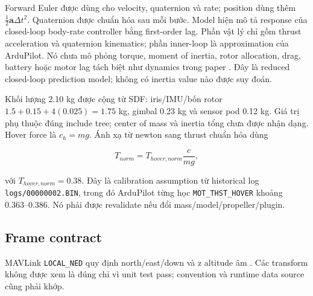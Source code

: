 \documentclass[11pt,a4paper]{article}
\newcommand{\code}[1]{\texttt{#1}}
\newcommand{\vect}[1]{\bm{#1}}
\begin{document}
Forward Euler được dùng cho velocity, quaternion và rate; position dùng thêm
$\tfrac12\vect a\Delta t^2$. Quaternion được chuẩn hóa sau mỗi bước. Model hiện
mô tả response của closed-loop body-rate controller bằng first-order lag. Phần
vật lý chỉ gồm thrust acceleration và quaternion kinematics; phần inner-loop là
approximation của ArduPilot. Nó chưa mô phỏng torque, moment of inertia, rotor
allocation, drag, battery hoặc motor lag tách biệt như dynamics trong paper
\cite{zhai2026pamppi}. Đây là reduced closed-loop prediction model; không có
inertia value nào được suy đoán.

Khối lượng 2.10 kg được cộng từ SDF: iris/IMU/bốn rotor
$1.5+0.15+4(0.025)=1.75$ kg, gimbal 0.23 kg và sensor pod 0.12 kg. Giá trị phụ
thuộc đúng include tree; center of mass và inertia tổng chưa được nhận dạng.
Hover force là $c_h=mg$. Ánh xạ từ newton sang thrust
chuẩn hóa dùng

\begin{equation}
T_{norm}=T_{hover,norm}\frac{c}{mg},
\end{equation}

với $T_{hover,norm}=0.38$. Đây là calibration assumption từ historical log
\code{logs/00000002.BIN}, trong đó ArduPilot từng học
\code{MOT\_THST\_HOVER} khoảng 0.363--0.386. Nó phải được revalidate nếu đổi
mass/model/propeller/plugin.

\subsection{Frame contract}

MAVLink \code{LOCAL\_NED} quy định north/east/down và z altitude âm
\cite{mavlinkCommon2026}. Các transform không được xem là đúng chỉ vì unit test
pass; convention và runtime data source cũng phải khớp.
\end{document}
